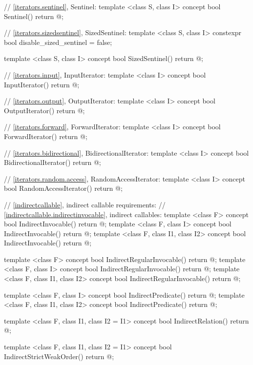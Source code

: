\begin{codeblock}
{{{{  // \ref{iterators.sentinel}, Sentinel:
  template <class S, class I>
  concept bool Sentinel() {
    return @\seebelow@;
  }

  // \ref{iterators.sizedsentinel}, SizedSentinel:
  template <class S, class I>
    constexpr bool disable_sized_sentinel = false;

  template <class S, class I>
  concept bool SizedSentinel() {
    return @\seebelow@;
  }

  // \ref{iterators.input}, InputIterator:
  template <class I>
  concept bool InputIterator() {
    return @\seebelow@;
  }

  // \ref{iterators.output}, OutputIterator:
  template <class I>
  concept bool OutputIterator() {
    return @\seebelow@;
  }

  // \ref{iterators.forward}, ForwardIterator:
  template <class I>
  concept bool ForwardIterator() {
    return @\seebelow@;
  }

  // \ref{iterators.bidirectional}, BidirectionalIterator:
  template <class I>
  concept bool BidirectionalIterator() {
    return @\seebelow@;
  }

  // \ref{iterators.random.access}, RandomAccessIterator:
  template <class I>
  concept bool RandomAccessIterator() {
    return @\seebelow@;
  }

  // \ref{indirectcallable}, indirect callable requirements:
  // \ref{indirectcallable.indirectinvocable}, indirect callables:
  template <class F>
  concept bool IndirectInvocable() {
    return @\seebelow@;
  }
  template <class F, class I>
  concept bool IndirectInvocable() {
    return @\seebelow@;
  }
  template <class F, class I1, class I2>
  concept bool IndirectInvocable() {
    return @\seebelow@;
  }

  template <class F>
  concept bool IndirectRegularInvocable() {
    return @\seebelow@;
  }
  template <class F, class I>
  concept bool IndirectRegularInvocable() {
    return @\seebelow@;
  }
  template <class F, class I1, class I2>
  concept bool IndirectRegularInvocable() {
    return @\seebelow@;
  }

  template <class F, class I>
  concept bool IndirectPredicate() {
    return @\seebelow@;
  }
  template <class F, class I1, class I2>
  concept bool IndirectPredicate() {
    return @\seebelow@;
  }

  template <class F, class I1, class I2 = I1>
  concept bool IndirectRelation() {
    return @\seebelow@;
  }

  template <class F, class I1, class I2 = I1>
  concept bool IndirectStrictWeakOrder() {
    return @\seebelow@;
  }

}}}}
\end{codeblock}

